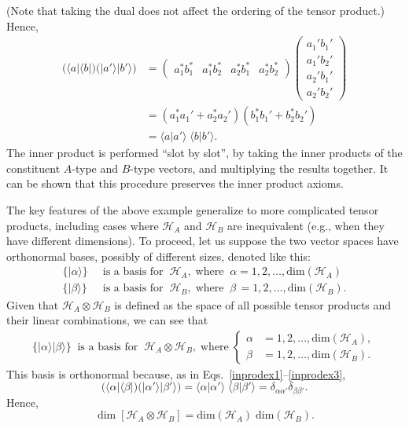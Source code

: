 \documentclass[pra,12pt]{revtex4-2}
\begin{document}
(Note that taking the dual does not affect the ordering of the tensor
product.)  Hence,
\begin{align}
  \Big(\langle a| \langle b|\Big)
  \Big(|a'\rangle |b'\rangle\Big)
  &= \begin{pmatrix} a_1^* b_1^* & a_1^* b_2^*
    & a_2^* b_1^* & a_2^* b_2^* \end{pmatrix}
  \begin{pmatrix} a_1' b_1' \\ a_1' b_2' \\
    a_2' b_1' \\ a_2' b_2' \end{pmatrix} \label{inprodex1}\\
  &= (a_1^*a_1' + a_2^*a_2') (b_1^*b_1' + b_2^*b_2') \\
  &= \langle a|a'\rangle \; \langle b|b'\rangle.  
  \label{inprodex3}
\end{align}
The inner product is performed ``slot by slot'', by taking the inner
products of the constituent $A$-type and $B$-type vectors, and
multiplying the results together.  It can be shown that this procedure
preserves the inner product axioms.

The key features of the above example generalize to more complicated
tensor products, including cases where $\mathscr{H}_A$ and
$\mathscr{H}_B$ are inequivalent (e.g., when they have different
dimensions).  To proceed, let us suppose the two vector spaces have
orthonormal bases, possibly of different sizes, denoted like this:
\begin{align}
  \Big\{ |\alpha\rangle \Big\} &\;\;\textrm{is a basis for}\;\; \mathscr{H}_A,
  \;\mathrm{where}\;\; \alpha = 1, 2, \dots, \mathrm{dim}(\mathscr{H}_A)\\
  \Big\{ |\beta\rangle \Big\} &\;\; \textrm{is a basis for}\;\; \mathscr{H}_B,
  \;\mathrm{where}\;\; \beta\, = 1, 2, \dots, \mathrm{dim}(\mathscr{H}_B).
\end{align}
Given that $\mathscr{H}_A \otimes \mathscr{H}_B$ is defined as the
space of all possible tensor products and their linear combinations,
we can see that
\begin{align}
  \Big\{ |\alpha \rangle |\beta \rangle \Big\}
  \;\;\textrm{is a basis for}\;\; \mathscr{H}_A \otimes \mathscr{H}_B,
  \;\mathrm{where}\;
  \begin{cases}
    \alpha &= 1, 2, \dots, \mathrm{dim}(\mathscr{H}_A), \\
    \beta &= 1, 2, \dots, \mathrm{dim}(\mathscr{H}_B).
  \end{cases}
\end{align}
This basis is orthonormal because, as in
Eqs.~\eqref{inprodex1}--\eqref{inprodex3},
\begin{equation}
  \Big(\langle \alpha| \langle \beta|\Big)
  \Big(|\alpha'\rangle |\beta'\rangle\Big)
  = \langle \alpha|\alpha'\rangle \; \langle \beta|\beta'\rangle
  = \delta_{\alpha\alpha'} \delta_{\beta\beta'}.
  \label{innerprod}
\end{equation}
Hence,
\begin{equation}
  \dim\left[\mathscr{H}_A \otimes \mathscr{H}_B\right]
  = \mathrm{dim}(\mathscr{H}_A)\; \mathrm{dim}(\mathscr{H}_B).
  \label{tensordim}
\end{equation}
\end{document}
